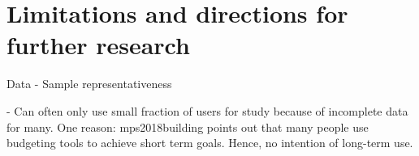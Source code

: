 
\section{Limitations and directions for further research}%
\label{sec:limitations}

Data
- Sample representativeness

- Can often only use small fraction of users for study because of incomplete
data for many. One reason: mps2018building points out that many people use
budgeting tools to achieve short term goals. Hence, no intention of long-term
use.



